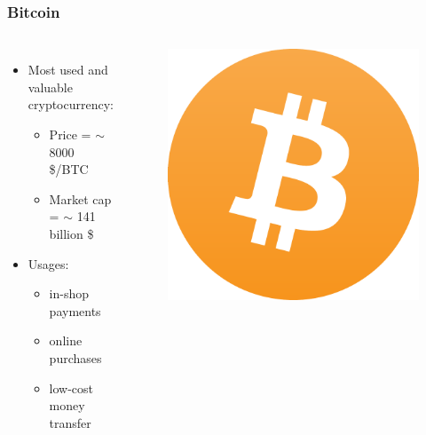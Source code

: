 \documentclass[pdf]{beamer}
\begin{document}
\begin{frame}
	\frametitle{Bitcoin}
	\begin{columns}
		\begin{itemize}
			\setlength \itemsep{1.5em}
			\item<1-> Most used and valuable cryptocurrency:
			\begin{itemize}
				\item<1-> Price = $\sim$ 8000 \$/BTC
				\item<1-> Market cap = $\sim$ 141 billion \$
			\end{itemize}
			\item<2-> Usages:
			\begin{itemize}
				\item<2-> in-shop payments
				\item<2-> online purchases
				\item<2-> low-cost money transfer
			\end{itemize}
		\end{itemize}
		\begin{figure}
			\hspace*{-1cm}
			\includegraphics[width=0.9\columnwidth]{figures/bitcoin}
			\vspace*{-0.1cm}
		\end{figure}
	\end{columns}
\end{frame}
\end{document}
